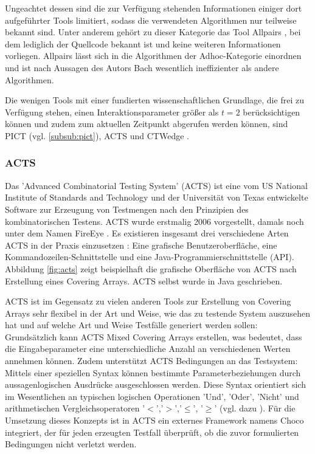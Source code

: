 Ungeachtet dessen sind die zur Verfügung stehenden Informationen einiger dort aufgeführter Tools limitiert, sodass die verwendeten Algorithmen nur teilweise bekannt sind. Unter anderem gehört zu dieser Kategorie das Tool Allpairs \cite{bach2012allpairs}, bei dem lediglich der Quellcode bekannt ist und keine weiteren Informationen vorliegen. Allpairs lässt sich in die Algorithmen der Adhoc-Kategorie einordnen und ist nach Aussagen des Autors Bach \cite{bach2012allpairs} wesentlich ineffizienter als andere Algorithmen.

Die wenigen Tools mit einer fundierten wissenschaftlichen Grundlage, die frei zu Verfügung stehen, einen Interaktionsparameter größer als $t=2$ berücksichtigen können und zudem zum aktuellen Zeitpunkt abgerufen werden können, sind PICT (vgl. \autoref{subsub:pict}), ACTS \cite{yu2013acts} und CTWedge \cite{ctwedge}. 


\subsubsection{ACTS}\label{subsub:acts}

Das 'Advanced Combinatorial Testing System' (ACTS) \cite{yu2013acts} ist eine vom US National Institute of Standards and Technology und der Universität von Texas entwickelte Software zur Erzeugung von Testmengen nach den Prinzipien des kombinatorischen Testens. ACTS wurde erstmalig 2006 vorgestellt, damals noch unter dem Namen FireEye \cite{lei2007ipog}. Es existieren insgesamt drei verschiedene Arten ACTS in der Praxis einzusetzen \cite{yu2013acts}: Eine grafische Benutzeroberfläche, eine Kommandozeilen-Schnittstelle und eine Java-Programmierschnittstelle (API). Abbildung \ref{fig:acts} zeigt beispielhaft die grafische Oberfläche von ACTS nach Erstellung eines Covering Arrays. ACTS selbst wurde in Java geschrieben.

ACTS ist im Gegensatz zu vielen anderen Tools zur Erstellung von Covering Arrays sehr flexibel in der Art und Weise, wie das zu testende System auszusehen hat und auf welche Art und Weise Testfälle generiert werden sollen: Grundsätzlich kann ACTS Mixed Covering Arrays erstellen, was bedeutet, dass die Eingabeparameter eine unterschiedliche Anzahl an verschiedenen Werten annehmen können. Zudem unterstützt ACTS Bedingungen an das Testsystem: Mittels einer speziellen Syntax können bestimmte Parameterbeziehungen durch aussagenlogischen Ausdrücke ausgeschlossen werden. Diese Syntax orientiert sich im Wesentlichen an typischen logischen Operationen 'Und', 'Oder', 'Nicht' und arithmetischen Vergleichsoperatoren '$<$','$>$','$\leq$', '$\geq$' (vgl. dazu \cite{yu2013acts}). Für die Umsetzung dieses Konzepts ist in ACTS ein externes Framework namens Choco \cite{solver} integriert, der für jeden erzeugten Testfall überprüft, ob die zuvor formulierten Bedingungen nicht verletzt werden.

